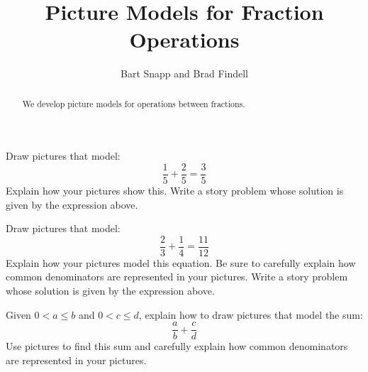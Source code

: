 \documentclass[nooutcomes]{ximera}
\title{Picture Models for Fraction Operations}
\author{Bart Snapp and Brad Findell}
\begin{document}
\begin{abstract}
  We develop picture models for operations between fractions.
\end{abstract}
\maketitle

\label{A:FO}
\begin{problem} 
Draw pictures that model:
\[
\frac{1}{5} + \frac{2}{5} = \frac{3}{5}
\]
Explain how your pictures show this. Write a story problem whose
solution is given by the expression above.
\end{problem}

\begin{problem} 
Draw pictures that model:
\[
\frac{2}{3} + \frac{1}{4} = \frac{11}{12}
\]
Explain how your pictures model this equation. Be sure to carefully
explain how common denominators are represented in your
pictures. Write a story problem whose solution is given by the
expression above.
\end{problem}

\begin{problem} 
Given $0<a\le b$ and $0<c\le d$, explain how to draw pictures
that model the sum:
\[
\frac{a}{b} + \frac{c}{d}
\]
Use pictures to find this sum and carefully explain how common
denominators are represented in your pictures.
\end{problem}

%
%
%
\end{document}
